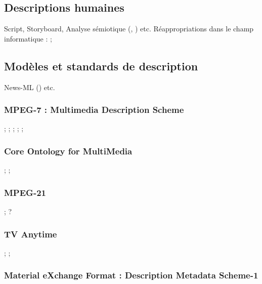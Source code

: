 
\subsection{Descriptions humaines}
Script, Storyboard, Analyse sémiotique (\cite{Martin2005}, \cite{ThiBui2003}) etc.
Réappropriations dans le champ informatique : \cite{Chakravarthy2009b} ; \cite{Chakravarthy2009c}

\subsection{Modèles et standards de description}
News-ML (\cite{Nack2004}) etc.

\subsubsection{MPEG-7 : Multimedia Description Scheme}
\cite{Hunter2001} ; \cite{Troncy2007} ; \cite{Nack2005a} ; \cite{Dasiopoulou2009} ; \cite{Garcia2005} ; 


\subsubsection{Core Ontology for MultiMedia}
\cite{Arndt2009} ; \cite{Arndt2007} ; \cite{Staab2008} 

\subsubsection{MPEG-21}
\cite{Burnett2003} ; \cite{Garcia2010} ? 

\subsubsection{TV Anytime}
\cite{Evain2000} ; \cite{Tsinaraki2004} ; \cite{Tsinaraki2005}

\subsubsection{Material eXchange Format : Description Metadata Scheme-1}
\cite{Marcos2009}


